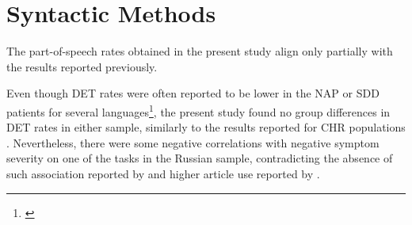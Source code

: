 




\section{Syntactic Methods}
\label{sec:discussion:syntactic}

The part-of-speech rates obtained in the present study align only partially with the results reported previously. 

Even though DET rates were often reported to be lower in the NAP or SDD patients for several languages\footnote{\cite{bedi2015automated, corcoran2018prediction, sarzynska2021detecting, tang2021natural}}, the present study found no group differences in DET rates in either sample, similarly to the results reported for CHR populations \citep{bilgrami2022construct, haas2020linking}. Nevertheless, there were some negative correlations with negative symptom severity on one of the tasks in the Russian sample, contradicting the absence of such association reported by \citet{corcoran2018prediction, bilgrami2022construct} and higher article use reported by \citet{mitchell2015quantifying}.

